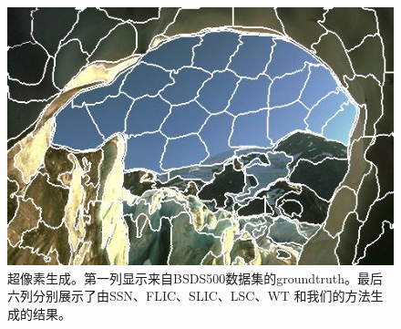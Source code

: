 \begin{figure}[h]
{\begin{minipage}[b]{0.13\linewidth}
\includegraphics[width=1\linewidth]{figures/img/ours_sp/ourssp_176051.jpg}
\end{minipage}}
\caption{超像素生成。第一列显示来自BSDS500数据集的groundtruth。最后六列分别展示了由SSN、FLIC、SLIC、LSC、WT 和我们的方法生成的结果。}
\label{Fig.5}
\end{figure}

